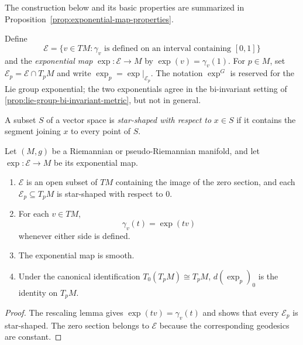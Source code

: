 The construction below and its basic properties are summarized in
Proposition~\ref{prop:exponential-map-properties}.

Define
\[
\mathcal E=\{v\in TM:\gamma_v\text{ is defined on an interval containing }[0,1]\}
\]
and the \emph{exponential map} $\exp:\mathcal E\to M$ by
$\exp(v)=\gamma_v(1)$.  For $p\in M$, set
$\mathcal E_p=\mathcal E\cap T_pM$ and write
$\exp_p=\exp|_{\mathcal E_p}$.  The notation $\exp^G$ is reserved for the Lie
group exponential; the two exponentials agree in the bi-invariant setting of
\cref{prop:lie-group-bi-invariant-metric}, but not in general.

A subset $S$ of a vector space is \emph{star-shaped with respect to} $x\in S$
if it contains the segment joining $x$ to every point of $S$.

\begin{proposition}
\label{prop:exponential-map-properties}


Let $(M, g)$ be a Riemannian or pseudo-Riemannian manifold, and let
$\exp: \mathcal{E} \to M$ be its exponential map.
\begin{enumerate}[label=(\alph*)]
\item $\mathcal{E}$ is an open subset of $TM$ containing the image of the zero
section, and each $\mathcal{E}_p \subseteq T_p M$ is star-shaped with respect
to $0$.
\item For each $v \in TM$,
\begin{equation}
\gamma_v(t) = \exp(tv) \tag{5.17}
\end{equation}
whenever either side is defined.
\item The exponential map is smooth.
\item Under the canonical identification $T_0(T_pM)\cong T_pM$,
$d(\exp_p)_0$ is the identity on $T_pM$.
\end{enumerate}

\begin{proof}
\sketch
The rescaling lemma gives $\exp(tv)=\gamma_v(t)$ and shows that every
$\mathcal E_p$ is star-shaped.  The zero section belongs to $\mathcal E$
because the corresponding geodesics are constant.


\end{proof}
\end{proposition}
